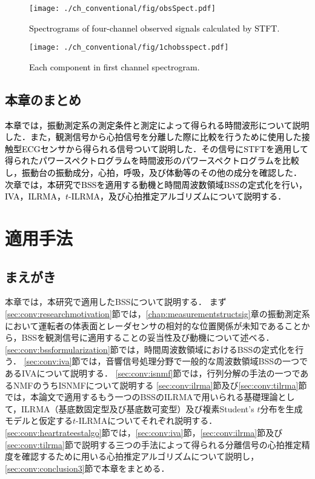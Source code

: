 \begin{figure}[tb]
\centering
\texttt{[image: ./ch\_conventional/fig/obsSpect.pdf]}
\caption{\textcolor{black}{Spectrograms of four-channel observed signals calculated by STFT.}}
\label{fig:4chobsspect}
\end{figure}

\begin{figure}[tb]
\centering
\texttt{[image: ./ch\_conventional/fig/1chobsspect.pdf]}
\caption{\textcolor{black}{Each component in first channel spectrogram.}}
\label{fig:1chobsspect}
\end{figure}

\clearpage
\section{本章のまとめ}
\label{sec:conv:conclusion2}
\textcolor{black}{本章では，振動測定系の測定条件と測定によって得られる時間波形について説明した．また，観測信号から心拍信号を分離した際に比較を行うために使用した接触型ECGセンサから得られる信号ついて説明した．その信号にSTFTを適用して得られたパワースペクトログラムを時間波形のパワースペクトログラムを比較し，振動台の振動成分，心拍，呼吸，及び体動等のその他の成分を確認した．
次章では，本研究でBSSを適用する動機と時間周波数領域BSSの定式化を行い，IVA，ILRMA，$t$-ILRMA，及び心拍推定アルゴリズムについて説明する．}


\chapter{適用手法}
\label{chap:methods}

\section{まえがき}
本章では，本研究で適用したBSSについて説明する．
まず\ref{sec:conv:researchmotivation}節では，{\ref{chap:measurementstructsig}章の振動測定系において運転者の体表面とレーダセンサの相対的な位置関係が未知であることから，BSSを観測信号に適用することの妥当性及び動機について述べる．}
\ref{sec:conv:bssformularization}節では，時間周波数領域におけるBSSの定式化を行う．
{\ref{sec:conv:iva}節では，音響信号処理分野で一般的な周波数領域BSSの一つであるIVAについて説明する．}
\ref{sec:conv:isnmf}節では，行列分解の手法の一つであるNMFのうちISNMFについて説明する
{\ref{sec:conv:ilrma}節及び\ref{sec:conv:tilrma}節では，本論文で適用するもう一つのBSSのILRMAで用いられる基礎理論として，ILRMA（基底数固定型及び基底数可変型）及び複素Student's $t$分布を生成モデルと仮定する$t$-ILRMAについてそれぞれ説明する．
\ref{sec:conv:heartrateestalgo}節では，\ref{sec:conv:iva}節，\ref{sec:conv:ilrma}節及び\ref{sec:conv:tilrma}節で説明する三つの手法によって得られる分離信号の心拍推定精度を確認するために用いる心拍推定アルゴリズムについて説明し，\ref{sec:conv:conclusion3}節で本章をまとめる．}

